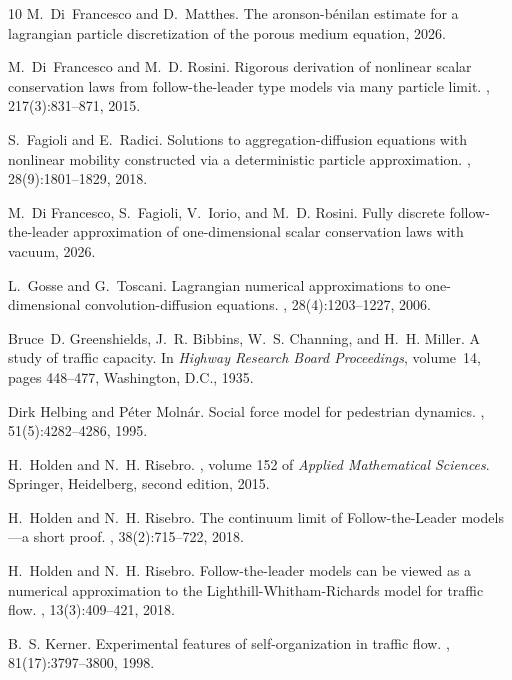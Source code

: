 \documentclass[reqno,oneside]{amsart}
\theoremstyle{plain}
\begin{document}
\begin{thebibliography}{10}
M.~Di~Francesco and D.~Matthes.
\newblock The aronson-b\'enilan estimate for a lagrangian particle discretization of the porous medium equation, 2026.

M.~Di~Francesco and M.~D. Rosini.
\newblock Rigorous derivation of nonlinear scalar conservation laws from follow-the-leader type models via many particle limit.
, 217(3):831--871, 2015.

S.~Fagioli and E.~Radici.
\newblock Solutions to aggregation-diffusion equations with nonlinear mobility constructed via a deterministic particle approximation.
, 28(9):1801--1829, 2018.

M.~Di Francesco, S.~Fagioli, V.~Iorio, and M.~D. Rosini.
\newblock Fully discrete follow-the-leader approximation of one-dimensional scalar conservation laws with vacuum, 2026.

L.~Gosse and G.~Toscani.
\newblock Lagrangian numerical approximations to one-dimensional convolution-diffusion equations.
, 28(4):1203--1227, 2006.

Bruce~D. Greenshields, J.~R. Bibbins, W.~S. Channing, and H.~H. Miller.
\newblock A study of traffic capacity.
\newblock In {\em Highway Research Board Proceedings}, volume~14, pages 448--477, Washington, D.C., 1935.

Dirk Helbing and P{\'e}ter Moln{\'a}r.
\newblock Social force model for pedestrian dynamics.
, 51(5):4282--4286, 1995.

H.~Holden and N.~H. Risebro.
, volume 152 of {\em Applied Mathematical Sciences}.
\newblock Springer, Heidelberg, second edition, 2015.

H.~Holden and N.~H. Risebro.
\newblock The continuum limit of {F}ollow-the-{L}eader models---a short proof.
, 38(2):715--722, 2018.

H.~Holden and N.~H. Risebro.
\newblock Follow-the-leader models can be viewed as a numerical approximation to the {L}ighthill-{W}hitham-{R}ichards model for traffic flow.
, 13(3):409--421, 2018.

B.~S. Kerner.
\newblock Experimental features of self-organization in traffic flow.
, 81(17):3797--3800, 1998.


\end{thebibliography}
\end{document}
